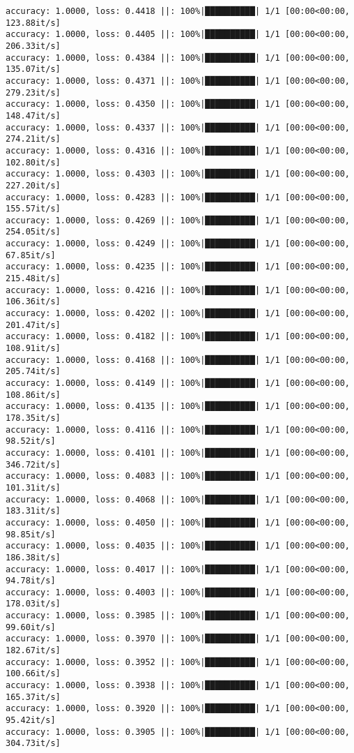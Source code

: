 \documentclass[
]{article}
\begin{document}
\begin{verbatim}
accuracy: 1.0000, loss: 0.4418 ||: 100%|██████████| 1/1 [00:00<00:00, 123.88it/s]
accuracy: 1.0000, loss: 0.4405 ||: 100%|██████████| 1/1 [00:00<00:00, 206.33it/s]
accuracy: 1.0000, loss: 0.4384 ||: 100%|██████████| 1/1 [00:00<00:00, 135.07it/s]
accuracy: 1.0000, loss: 0.4371 ||: 100%|██████████| 1/1 [00:00<00:00, 279.23it/s]
accuracy: 1.0000, loss: 0.4350 ||: 100%|██████████| 1/1 [00:00<00:00, 148.47it/s]
accuracy: 1.0000, loss: 0.4337 ||: 100%|██████████| 1/1 [00:00<00:00, 274.21it/s]
accuracy: 1.0000, loss: 0.4316 ||: 100%|██████████| 1/1 [00:00<00:00, 102.80it/s]
accuracy: 1.0000, loss: 0.4303 ||: 100%|██████████| 1/1 [00:00<00:00, 227.20it/s]
accuracy: 1.0000, loss: 0.4283 ||: 100%|██████████| 1/1 [00:00<00:00, 155.57it/s]
accuracy: 1.0000, loss: 0.4269 ||: 100%|██████████| 1/1 [00:00<00:00, 254.05it/s]
accuracy: 1.0000, loss: 0.4249 ||: 100%|██████████| 1/1 [00:00<00:00, 67.85it/s]
accuracy: 1.0000, loss: 0.4235 ||: 100%|██████████| 1/1 [00:00<00:00, 215.48it/s]
accuracy: 1.0000, loss: 0.4216 ||: 100%|██████████| 1/1 [00:00<00:00, 106.36it/s]
accuracy: 1.0000, loss: 0.4202 ||: 100%|██████████| 1/1 [00:00<00:00, 201.47it/s]
accuracy: 1.0000, loss: 0.4182 ||: 100%|██████████| 1/1 [00:00<00:00, 108.91it/s]
accuracy: 1.0000, loss: 0.4168 ||: 100%|██████████| 1/1 [00:00<00:00, 205.74it/s]
accuracy: 1.0000, loss: 0.4149 ||: 100%|██████████| 1/1 [00:00<00:00, 108.86it/s]
accuracy: 1.0000, loss: 0.4135 ||: 100%|██████████| 1/1 [00:00<00:00, 178.35it/s]
accuracy: 1.0000, loss: 0.4116 ||: 100%|██████████| 1/1 [00:00<00:00, 98.52it/s]
accuracy: 1.0000, loss: 0.4101 ||: 100%|██████████| 1/1 [00:00<00:00, 346.72it/s]
accuracy: 1.0000, loss: 0.4083 ||: 100%|██████████| 1/1 [00:00<00:00, 101.31it/s]
accuracy: 1.0000, loss: 0.4068 ||: 100%|██████████| 1/1 [00:00<00:00, 183.31it/s]
accuracy: 1.0000, loss: 0.4050 ||: 100%|██████████| 1/1 [00:00<00:00, 98.85it/s]
accuracy: 1.0000, loss: 0.4035 ||: 100%|██████████| 1/1 [00:00<00:00, 186.38it/s]
accuracy: 1.0000, loss: 0.4017 ||: 100%|██████████| 1/1 [00:00<00:00, 94.78it/s]
accuracy: 1.0000, loss: 0.4003 ||: 100%|██████████| 1/1 [00:00<00:00, 178.03it/s]
accuracy: 1.0000, loss: 0.3985 ||: 100%|██████████| 1/1 [00:00<00:00, 99.60it/s]
accuracy: 1.0000, loss: 0.3970 ||: 100%|██████████| 1/1 [00:00<00:00, 182.67it/s]
accuracy: 1.0000, loss: 0.3952 ||: 100%|██████████| 1/1 [00:00<00:00, 100.66it/s]
accuracy: 1.0000, loss: 0.3938 ||: 100%|██████████| 1/1 [00:00<00:00, 165.37it/s]
accuracy: 1.0000, loss: 0.3920 ||: 100%|██████████| 1/1 [00:00<00:00, 95.42it/s]
accuracy: 1.0000, loss: 0.3905 ||: 100%|██████████| 1/1 [00:00<00:00, 304.73it/s]

\end{verbatim}
\end{document}
